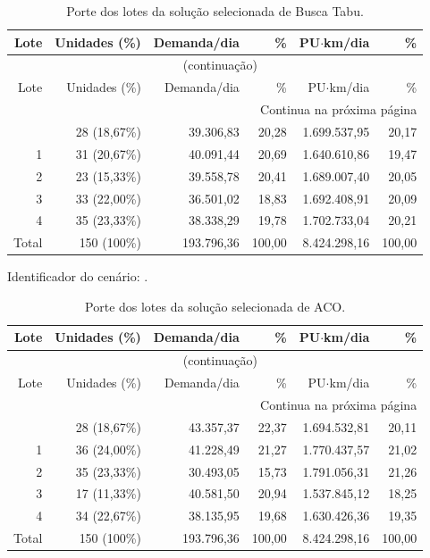 \begingroup\small
\setlength{\tabcolsep}{5pt}
\begin{longtable}{rrrrrr}
\caption{Porte dos lotes da solução selecionada de Busca Tabu.}\label{tab:lotes-tabu}\\
\toprule
Lote & Unidades (\%) & Demanda/dia & \% & PU$\cdot$km/dia & \% \\
\midrule
\endfirsthead
\multicolumn{6}{c}{\tablename~\thetable{} (continuação)}\\
\toprule
Lote & Unidades (\%) & Demanda/dia & \% & PU$\cdot$km/dia & \% \\
\midrule
\endhead
\midrule\multicolumn{6}{r}{Continua na próxima página}\\
\endfoot
\bottomrule
\endlastfoot
0 & 28 (18,67\%) & 39.306,83 & 20,28 & 1.699.537,95 & 20,17 \\
1 & 31 (20,67\%) & 40.091,44 & 20,69 & 1.640.610,86 & 19,47 \\
2 & 23 (15,33\%) & 39.558,78 & 20,41 & 1.689.007,40 & 20,05 \\
3 & 33 (22,00\%) & 36.501,02 & 18,83 & 1.692.408,91 & 20,09 \\
4 & 35 (23,33\%) & 38.338,29 & 19,78 & 1.702.733,04 & 20,21 \\
Total & 150 (100\%) & 193.796,36 & 100,00 & 8.424.298,16 & 100,00 \\
\end{longtable}
\endgroup

Identificador do cenário: {\footnotesize{}}.

\begingroup\small
\setlength{\tabcolsep}{5pt}
\begin{longtable}{rrrrrr}
\caption{Porte dos lotes da solução selecionada de ACO.}\label{tab:lotes-aco}\\
\toprule
Lote & Unidades (\%) & Demanda/dia & \% & PU$\cdot$km/dia & \% \\
\midrule
\endfirsthead
\multicolumn{6}{c}{\tablename~\thetable{} (continuação)}\\
\toprule
Lote & Unidades (\%) & Demanda/dia & \% & PU$\cdot$km/dia & \% \\
\midrule
\endhead
\midrule\multicolumn{6}{r}{Continua na próxima página}\\
\endfoot
\bottomrule
\endlastfoot
0 & 28 (18,67\%) & 43.357,37 & 22,37 & 1.694.532,81 & 20,11 \\
1 & 36 (24,00\%) & 41.228,49 & 21,27 & 1.770.437,57 & 21,02 \\
2 & 35 (23,33\%) & 30.493,05 & 15,73 & 1.791.056,31 & 21,26 \\
3 & 17 (11,33\%) & 40.581,50 & 20,94 & 1.537.845,12 & 18,25 \\
4 & 34 (22,67\%) & 38.135,95 & 19,68 & 1.630.426,36 & 19,35 \\
Total & 150 (100\%) & 193.796,36 & 100,00 & 8.424.298,16 & 100,00 \\
\end{longtable}
\endgroup

